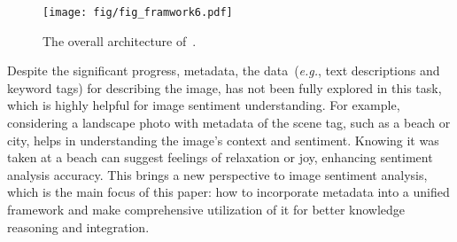\begin{figure*}[t]
\centering
\texttt{[image: fig/fig\_framwork6.pdf]}
\caption{The overall architecture of~\shortname.}
\label{fig:fig2}
\vspace{-6mm}
\end{figure*}

% 
Despite the significant progress, metadata, the data~(\textit{e.g.}, text descriptions and keyword tags) for describing the image, has not been fully explored in this task, which is highly helpful for image sentiment understanding.
% 
For example, considering a landscape photo with metadata of the scene tag, such as a beach or city, helps in understanding the image's context and sentiment. Knowing it was taken at a beach can suggest feelings of relaxation or joy, enhancing sentiment analysis accuracy.
% 
This brings a new perspective to image sentiment analysis, which is the main focus of this paper: how to incorporate metadata into a unified framework and make comprehensive utilization of it for better knowledge reasoning and integration.

